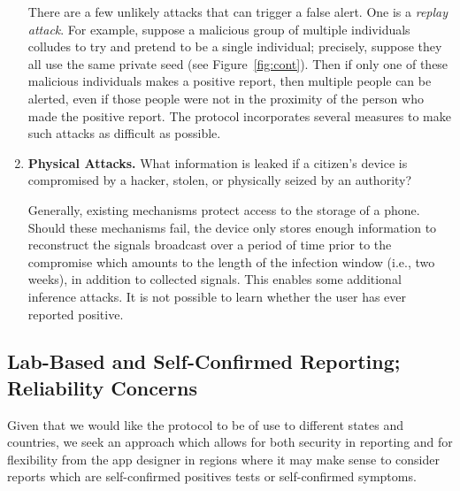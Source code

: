 \begin{enumerate}[leftmargin=*]
    There are a few unlikely attacks that can trigger a false alert. 
    One is a {\em replay attack}. For example, suppose a malicious group of multiple individuals colludes to try and pretend to be a single individual; precisely, suppose they all use the same private seed (see Figure~\ref{fig:cont}).  Then if only one of these malicious individuals makes a positive report, then multiple people can be alerted, even if those people were not in the proximity of the person who made the positive report.  The protocol incorporates several measures to make such attacks as difficult as possible. 
    
    
    \item \textbf{Physical Attacks.} What information is leaked if a citizen's device is compromised by a hacker, stolen, or physically seized by an authority?
    
    Generally, existing mechanisms protect access to the storage of a phone. Should these mechanisms fail, the device only stores enough information to reconstruct the signals broadcast over a period of time prior to the compromise which amounts  to the length of the infection window (i.e., two weeks), in addition to collected signals. This enables some additional inference attacks. It is not possible to learn whether the user has ever reported positive. 

\end{enumerate}



\subsection{Lab-Based and Self-Confirmed Reporting; Reliability Concerns} \label{sect:lab}
Given that we would like the protocol to be of use to different states and countries, we seek an approach which allows for both security in reporting and for flexibility from the app designer in regions where it may make sense to  consider reports which are self-confirmed positives tests or self-confirmed symptoms.


